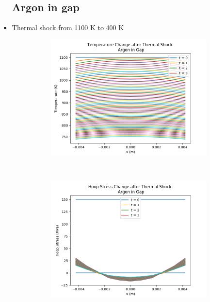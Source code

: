 \documentclass[12pt]{article}
\begin{document}
\begin{itemize}
\subsection{Argon in gap}
\item Thermal shock from 1100 K to 400 K
\begin{figure}[h]
    \centering
    \begin{subfigure}[b]{0.4\textwidth}
        \includegraphics[width=\textwidth]{thermalShock_Ar_T_vs_x.png}
        \caption{}
        \label{fig:t125}
    \end{subfigure}
    ~ 
    \begin{subfigure}[b]{0.4\textwidth}
        \includegraphics[width=\textwidth]{thermalShock_Ar_stress_vs_x.png}

\end{subfigure}
\end{figure}
\end{itemize}
\end{document}
